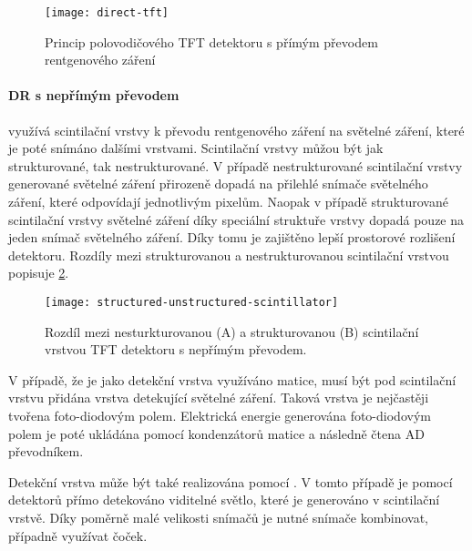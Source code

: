 \begin{figure}[ht]
\centering
\texttt{[image: direct-tft]}
\caption{Princip polovodičového TFT detektoru s přímým převodem rentgenového záření \cite[str.~511]{Radiation-Detection-and-Measurement}}
\label{fig:direct-tft}
\end{figure}

\paragraph{DR s nepřímým převodem}
využívá scintilační vrstvy k převodu rentgenového záření na světelné záření, které je poté snímáno dalšími vrstvami. Scintilační vrstvy můžou být jak strukturované, tak nestrukturované. V případě nestrukturované scintilační vrstvy generované světelné záření přirozeně dopadá na přilehlé snímače světelného záření, které odpovídají jednotlivým pixelům. Naopak v případě strukturované scintilační vrstvy světelné záření díky speciální struktuře vrstvy dopadá pouze na jeden snímač světelného záření. Díky tomu je zajištěno lepší prostorové rozlišení detektoru. Rozdíly mezi strukturovanou a nestrukturovanou scintilační vrstvou popisuje \cref{fig:structured-unstructured-scintillator}.

\begin{figure}[ht]
\centering
\texttt{[image: structured-unstructured-scintillator]}
\caption{Rozdíl mezi nesturkturovanou (A) a strukturovanou (B) scintilační vrstvou TFT detektoru s nepřímým převodem. \cite[str~210]{Diagnostic-Radiology}}
\label{fig:structured-unstructured-scintillator}
\end{figure}

V případě, že je jako detekční vrstva využíváno  matice, musí být pod scintilační vrstvu přidána vrstva detekující světelné záření. Taková vrstva je nejčastěji tvořena foto-diodovým polem. Elektrická energie generována foto-diodovým polem je poté ukládána pomocí kondenzátorů  matice a následně  čtena AD převodníkem.

Detekční vrstva může být také realizována pomocí . V tomto případě je pomocí  detektorů přímo detekováno viditelné světlo, které je generováno v scintilační vrstvě. Díky poměrně malé velikosti  snímačů je nutné snímače kombinovat, případně využívat čoček.

